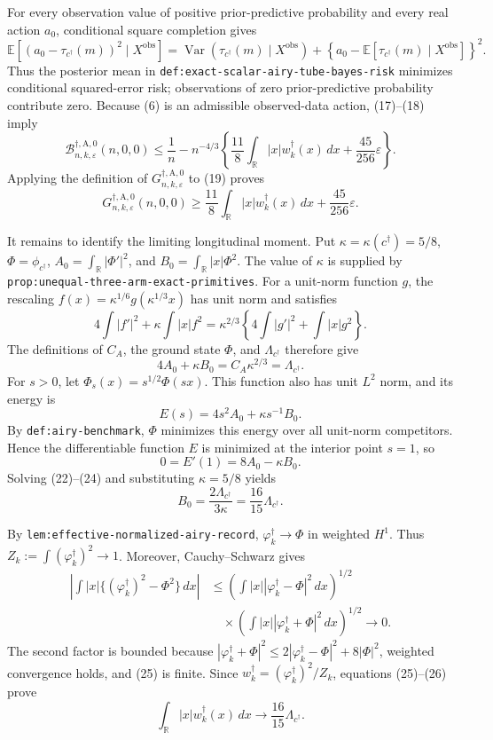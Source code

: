For every observation value of positive prior-predictive probability and every real action \(a_0\), conditional square completion gives
\[
\mathbb E[(a_0-\tau_{c^\dagger}(m))^2\mid X^{\mathrm{obs}}]
=\operatorname{Var}(\tau_{c^\dagger}(m)\mid X^{\mathrm{obs}})
+\left\{a_0-\mathbb E[\tau_{c^\dagger}(m)\mid X^{\mathrm{obs}}]\right\}^2.
\tag{18}
\]
Thus the posterior mean in
\texttt{def:exact-scalar-airy-tube-bayes-risk} minimizes conditional squared-error risk; observations of zero prior-predictive probability contribute zero.  Because (6) is an admissible observed-data action, (17)--(18) imply
\[
\mathcal B_{n,k,\varepsilon}^{\dagger,\mathrm A,0}(n,0,0)
\leq \frac1n-n^{-4/3}\left\{
\frac{11}{8}\int_{\mathbb R}|x|w_k^\dagger(x)\,dx
+\frac{45}{256}\varepsilon\right\}.
\tag{19}
\]
Applying the definition of
\(G_{n,k,\varepsilon}^{\dagger,\mathrm A,0}\) to (19) proves
\[
G_{n,k,\varepsilon}^{\dagger,\mathrm A,0}(n,0,0)
\geq
\frac{11}{8}\int_{\mathbb R}|x|w_k^\dagger(x)\,dx
+\frac{45}{256}\varepsilon.
\tag{20}
\]

It remains to identify the limiting longitudinal moment.  Put
\(\kappa=\kappa(c^\dagger)=5/8\),
\(\Phi=\phi_{c^\dagger}\),
\(A_0=\int_{\mathbb R}|\Phi'|^2\), and
\(B_0=\int_{\mathbb R}|x|\Phi^2\).  The value of \(\kappa\) is supplied by
\texttt{prop:unequal-three-arm-exact-primitives}.  For a unit-norm function \(g\), the rescaling
\(f(x)=\kappa^{1/6}g(\kappa^{1/3}x)\) has unit norm and satisfies
\[
4\int|f'|^2+\kappa\int|x|f^2
=\kappa^{2/3}\left\{4\int|g'|^2+\int|x|g^2\right\}.
\tag{21}
\]
The definitions of \(C_A\), the ground state \(\Phi\), and \(\Lambda_{c^\dagger}\) therefore give
\[
4A_0+\kappa B_0=C_A\kappa^{2/3}=\Lambda_{c^\dagger}.
\tag{22}
\]
For \(s>0\), let \(\Phi_s(x)=s^{1/2}\Phi(sx)\).  This function also has unit \(L^2\) norm, and its energy is
\[
E(s)=4s^2A_0+\kappa s^{-1}B_0.
\tag{23}
\]
By \texttt{def:airy-benchmark}, \(\Phi\) minimizes this energy over all unit-norm competitors.  Hence the differentiable function \(E\) is minimized at the interior point \(s=1\), so
\[
0=E'(1)=8A_0-\kappa B_0.
\tag{24}
\]
Solving (22)--(24) and substituting \(\kappa=5/8\) yields
\[
B_0=\frac{2\Lambda_{c^\dagger}}{3\kappa}
=\frac{16}{15}\Lambda_{c^\dagger}.
\tag{25}
\]

By \texttt{lem:effective-normalized-airy-record},
\(\varphi_k^\dagger\to\Phi\) in weighted \(H^1\).  Thus
\(Z_k:=\int(\varphi_k^\dagger)^2\to1\).  Moreover, Cauchy--Schwarz gives
\[
\begin{aligned}
\left|\int |x|\{(\varphi_k^\dagger)^2-\Phi^2\}\,dx\right|
&\leq
\left(\int |x||\varphi_k^\dagger-\Phi|^2\,dx\right)^{1/2}\\
&\quad\times
\left(\int |x||\varphi_k^\dagger+\Phi|^2\,dx\right)^{1/2}
\longrightarrow0.
\end{aligned}
\tag{26}
\]
The second factor is bounded because
\(|\varphi_k^\dagger+\Phi|^2\leq
2|\varphi_k^\dagger-\Phi|^2+8|\Phi|^2\), weighted convergence holds, and (25) is finite.  Since
\(w_k^\dagger=(\varphi_k^\dagger)^2/Z_k\), equations (25)--(26) prove
\[
\int_{\mathbb R}|x|w_k^\dagger(x)\,dx
\longrightarrow\frac{16}{15}\Lambda_{c^\dagger}.
\tag{27}
\]


